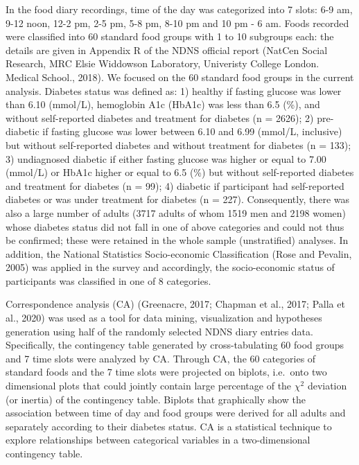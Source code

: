 \documentclass[utf8]{frontiersSCNS}
\begin{document}
In the food diary recordings, time of the day was categorized into 7
slots: 6-9 am, 9-12 noon, 12-2 pm, 2-5 pm, 5-8 pm, 8-10 pm and 10 pm - 6
am. Foods recorded were classified into 60 standard food groups with 1
to 10 subgroups each: the details are given in Appendix R of the NDNS
official report (NatCen Social Research, MRC Elsie Widdowson Laboratory,
Univeristy College London. Medical School., 2018). We focused on the 60
standard food groups in the current analysis. Diabetes status was
defined as: 1) healthy if fasting glucose was lower than 6.10 (mmol/L),
hemoglobin A1c (HbA1c) was less than 6.5 (\%), and without self-reported
diabetes and treatment for diabetes (n = 2626); 2) pre-diabetic if
fasting glucose was lower between 6.10 and 6.99 (mmol/L, inclusive) but
without self-reported diabetes and without treatment for diabetes (n =
133); 3) undiagnosed diabetic if either fasting glucose was higher or
equal to 7.00 (mmol/L) or HbA1c higher or equal to 6.5 (\%) but without
self-reported diabetes and treatment for diabetes (n = 99); 4) diabetic
if participant had self-reported diabetes or was under treatment for
diabetes (n = 227). Consequently, there was also a large number of
adults (3717 adults of whom 1519 men and 2198 women) whose diabetes
status did not fall in one of above categories and could not thus be
confirmed; these were retained in the whole sample (unstratified)
analyses. In addition, the National Statistics Socio-economic
Classification (Rose and Pevalin, 2005) was applied in the survey and
accordingly, the socio-economic status of participants was classified in
one of 8 categories.

Correspondence analysis (CA) (Greenacre, 2017; Chapman et al., 2017;
Palla et al., 2020) was used as a tool for data mining, visualization
and hypotheses generation using half of the randomly selected NDNS diary
entries data. Specifically, the contingency table generated by
cross-tabulating 60 food groups and 7 time slots were analyzed by CA.
Through CA, the 60 categories of standard foods and the 7 time slots
were projected on biplots, i.e.~onto two dimensional plots that could
jointly contain large percentage of the \(\chi^2\) deviation (or
inertia) of the contingency table. Biplots that graphically show the
association between time of day and food groups were derived for all
adults and separately according to their diabetes status. CA is a
statistical technique to explore relationships between categorical
variables in a two-dimensional contingency table.
\end{document}
